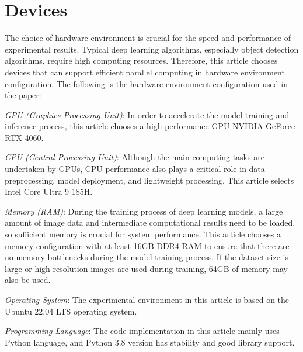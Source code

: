 \documentclass[conference]{IEEEtran}
\begin{document}
\section{Devices}
The choice of hardware environment is crucial for the speed and performance of experimental results. Typical deep learning algorithms, especially object detection algorithms, require high computing resources. Therefore, this article chooses devices that can support efficient parallel computing in hardware environment configuration. The following is the hardware environment configuration used in the paper:

\textit{GPU (Graphics Processing Unit)}: In order to accelerate the model training and inference process, this article chooses a high-performance GPU NVIDIA GeForce RTX 4060.

\textit{CPU (Central Processing Unit)}: Although the main computing tasks are undertaken by GPUs, CPU performance also plays a critical role in data preprocessing, model deployment, and lightweight processing. This article selects Intel Core Ultra 9 185H.

\textit{Memory (RAM)}: During the training process of deep learning models, a large amount of image data and intermediate computational results need to be loaded, so sufficient memory is crucial for system performance. This article chooses a memory configuration with at least 16GB DDR4 RAM to ensure that there are no memory bottlenecks during the model training process. If the dataset size is large or high-resolution images are used during training, 64GB of memory may also be used.

\textit{Operating System}: The experimental environment in this article is based on the Ubuntu 22.04 LTS operating system.

\textit{Programming Language}: The code implementation in this article mainly uses Python language, and Python 3.8 version has stability and good library support.



\end{document}

